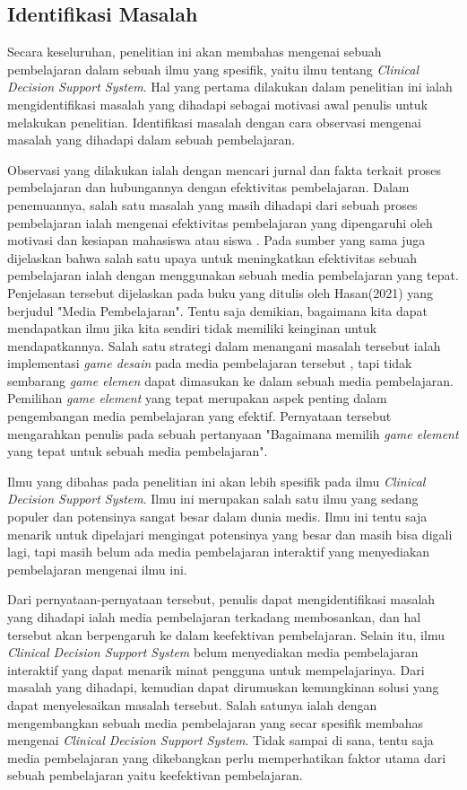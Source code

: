 \subsection{Identifikasi Masalah}
Secara keseluruhan, penelitian ini akan membahas mengenai sebuah pembelajaran dalam sebuah ilmu yang spesifik, yaitu ilmu tentang \textit{Clinical Decision Support System}.
Hal yang pertama dilakukan dalam penelitian ini ialah mengidentifikasi masalah yang dihadapi sebagai motivasi awal penulis untuk melakukan penelitian.
Identifikasi masalah dengan cara observasi mengenai masalah yang dihadapi dalam sebuah pembelajaran. 	

Observasi yang dilakukan ialah dengan mencari jurnal dan fakta terkait proses pembelajaran dan hubungannya dengan efektivitas pembelajaran.
Dalam penemuannya, salah satu masalah yang masih dihadapi dari sebuah proses pembelajaran ialah mengenai efektivitas pembelajaran yang dipengaruhi oleh motivasi dan kesiapan mahasiswa atau siswa \cite{hasan2021media}.
Pada sumber yang sama juga dijelaskan bahwa salah satu upaya untuk meningkatkan efektivitas sebuah pembelajaran ialah dengan menggunakan sebuah media pembelajaran yang tepat.
Penjelasan tersebut dijelaskan pada buku yang ditulis oleh Hasan(2021) yang berjudul "Media Pembelajaran"\cite{hasan2021media}.
Tentu saja demikian, bagaimana kita dapat mendapatkan ilmu jika kita sendiri tidak memiliki keinginan untuk mendapatkannya.
Salah satu strategi dalam menangani masalah tersebut ialah implementasi \textit{game desain} pada media pembelajaran tersebut \cite{EnjoyLearningLikeGaming}, tapi tidak sembarang \textit{game elemen} dapat dimasukan ke dalam sebuah media pembelajaran.
Pemilihan \textit{game element} yang tepat merupakan aspek penting dalam pengembangan media pembelajaran yang efektif\cite{kapp2012gamification}. Pernyataan tersebut mengarahkan penulis pada sebuah pertanyaan "Bagaimana memilih \textit{game element} yang tepat untuk sebuah media pembelajaran".

Ilmu yang dibahas pada penelitian ini akan lebih spesifik pada ilmu \textit{Clinical Decision Support System}. Ilmu ini merupakan salah satu ilmu yang sedang populer dan potensinya sangat besar dalam dunia medis.
Ilmu ini tentu saja menarik untuk dipelajari mengingat potensinya yang besar dan masih bisa digali lagi, tapi masih belum ada media pembelajaran interaktif yang menyediakan pembelajaran mengenai ilmu ini.

Dari pernyataan-pernyataan tersebut, penulis dapat mengidentifikasi masalah yang dihadapi ialah media pembelajaran terkadang membosankan, dan hal tersebut akan berpengaruh ke dalam keefektivan pembelajaran.
Selain itu, ilmu \textit{Clinical Decision Support System} belum menyediakan media pembelajaran interaktif yang dapat menarik minat pengguna untuk mempelajarinya.
Dari masalah yang dihadapi, kemudian dapat dirumuskan kemungkinan solusi yang dapat menyelesaikan masalah tersebut. Salah satunya ialah dengan mengembangkan sebuah media pembelajaran yang secar spesifik membahas mengenai \textit{Clinical Decision Support System}.
Tidak sampai di sana, tentu saja media pembelajaran yang dikebangkan perlu memperhatikan faktor utama dari sebuah pembelajaran yaitu keefektivan pembelajaran.

